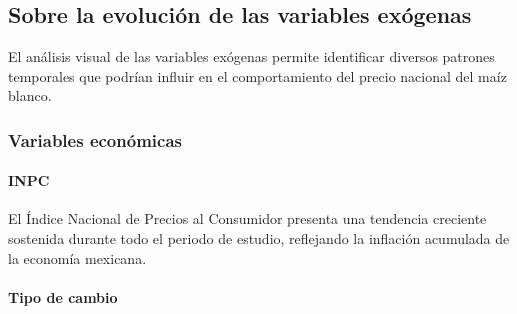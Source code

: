 \documentclass[11pt]{article}
\begin{document}
    \begin{center}
    \end{center}
    { \hspace*{\fill} \\}
    
    \begin{center}
    \end{center}
    { \hspace*{\fill} \\}
    
    \begin{center}
    \end{center}
    { \hspace*{\fill} \\}
    
    \hypertarget{sobre-la-evoluciuxf3n-de-las-variables-exuxf3genas}{%
\subsection{Sobre la evolución de las variables
exógenas}\label{sobre-la-evoluciuxf3n-de-las-variables-exuxf3genas}}

El análisis visual de las variables exógenas permite identificar
diversos patrones temporales que podrían influir en el comportamiento
del precio nacional del maíz blanco.

\hypertarget{variables-econuxf3micas}{%
\subsubsection{Variables económicas}\label{variables-econuxf3micas}}

\hypertarget{inpc}{%
\paragraph{INPC}\label{inpc}}

El Índice Nacional de Precios al Consumidor presenta una tendencia
creciente sostenida durante todo el periodo de estudio, reflejando la
inflación acumulada de la economía mexicana.

\hypertarget{tipo-de-cambio}{%
\paragraph{Tipo de cambio}\label{tipo-de-cambio}}
\end{document}

